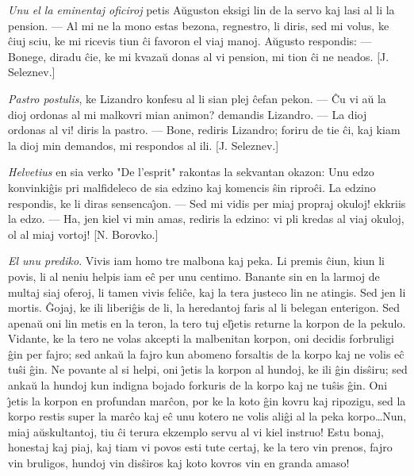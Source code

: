 \emph{Unu el la eminentaj oficiroj} petis A\u uguston eksigi lin de
la servo kaj lasi al li la pension. --- Al mi ne la mono estas
bezona, regnestro, li diris, sed mi volus, ke \^ciuj sciu, ke mi
ricevis tiun \^ci favoron el viaj manoj. A\u ugusto respondis: ---
Bonege, diradu \^cie, ke mi kvaza\u u donas al vi pension, mi tion
\^ci ne neados. [J. Seleznev.]

\emph{Pastro postulis}, ke Lizandro konfesu al li sian plej \^cefan
pekon. --- \^Cu vi a\u u la dioj ordonas al mi malkovri mian animon?
demandis Lizandro. --- La dioj ordonas al vi! diris la pastro. ---
Bone, rediris Lizandro; foriru de tie \^ci, kaj kiam la dioj min
demandos, mi respondos al ili. [J. Seleznev.]

\emph{Helvetius} en sia verko "De l'esprit" rakontas la sekvantan
okazon: Unu edzo konvinki\^gis pri malfideleco de sia edzino kaj
komencis \^sin ripro\^ci. La edzino respondis, ke li diras
sensenca\^{\j}on. --- Sed mi vidis per miaj propraj okuloj! ekkriis
la edzo. --- Ha, jen kiel vi min amas, rediris la edzino: vi pli
kredas al viaj okuloj, ol al miaj vortoj! [N. Borovko.]

\emph{El unu prediko}. Vivis iam homo tre malbona kaj peka. Li
premis \^ciun, kiun li povis, li al neniu helpis iam e\^c per unu
centimo. Banante sin en la larmoj de multaj siaj oferoj, li tamen
vivis feli\^ce, kaj la tera justeco lin ne atingis. Sed jen li
mortis. \^Gojaj, ke ili liberi\^gis de li, la heredantoj faris al li
belegan enterigon. Sed apena\u u oni lin metis en la teron, la tero
tuj el\^{\j}etis returne la korpon de la pekulo. Vidante, ke la tero
ne volas akcepti la malbenitan korpon, oni decidis forbruligi \^gin
per fajro; sed anka\u u la fajro kun abomeno forsaltis de la korpo
kaj ne volis e\^c tu\^si \^gin. Ne povante al si helpi, oni
\^{\j}etis la korpon al hundoj, ke ili \^gin dis\^siru; sed anka\u u
la hundoj kun indigna bojado forkuris de la korpo kaj ne tu\^sis
\^gin. Oni \^{\j}etis la korpon en profundan mar\^con, por ke la
koto \^gin kovru kaj ripozigu, sed la korpo restis super la mar\^co
kaj e\^c unu kotero ne volis ali\^gi al la peka korpo\dots Nun, miaj
a\u uskultantoj, tiu \^ci terura ekzemplo servu al vi kiel instruo!
Estu bonaj, honestaj kaj piaj, kaj tiam vi povos esti tute certaj,
ke la tero vin prenos, fajro vin bruligos, hundoj vin dis\^siros kaj
koto kovros vin en granda amaso!

